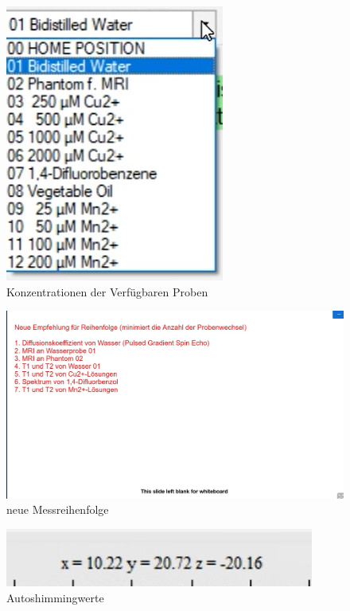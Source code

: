 
\vspace{0.5cm}
\begin{figure}[H]
    \includegraphics[width = 0.7 \textwidth]{Screenshot2/Konzentrationen_der_Messungen.jpg}
    \caption{Konzentrationen der Verfügbaren Proben}
    \end{figure}
    
\begin{figure}[H]
    \includegraphics[width = 0.7 \textwidth]{Screenshot2/Messreihenfolge.jpg}
    \caption{neue Messreihenfolge}
\end{figure}

\begin{figure}[H]
    \includegraphics[width = 0.7 \textwidth]{Screenshot2/Autoshimwerte.jpg}
    \caption{Autoshimmingwerte}
\end{figure}

